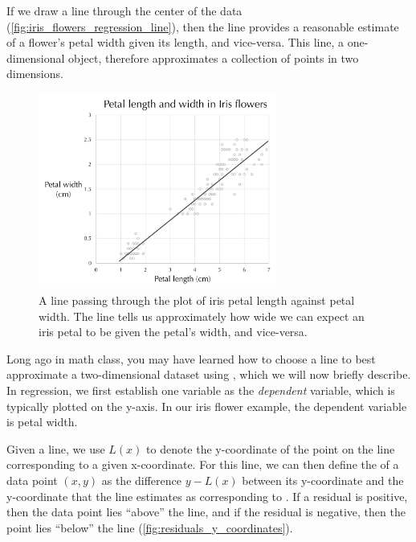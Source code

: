 If we draw a line through the center of the data (\autoref{fig:iris_flowers_regression_line}), then the line provides a reasonable estimate of a flower's petal width given its length, and vice-versa. This line, a one-dimensional object, therefore approximates a collection of points in two dimensions.\\

\begin{figure}[h]
\centering
\mySfFamily
\includegraphics[width = 0.7\textwidth]{../images/iris_flowers_regression_line.png}
\caption{A line passing through the plot of iris petal length against petal width. The line tells us approximately how wide we can expect an iris petal to be given the petal's width, and vice-versa.}
\label{fig:iris_flowers_regression_line}
\end{figure}

\begin{qbox}\end{qbox}

Long ago in math class, you may have learned how to choose a line to best approximate a two-dimensional dataset using , which we will now briefly describe. In regression, we first establish one variable as the \textit{dependent} variable, which is typically plotted on the y-axis. In our iris flower example, the dependent variable is petal width.

Given a line, we use $L(x)$ to denote the y-coordinate of the point on the line corresponding to a given x-coordinate. For this line, we can then define the  of a data point $(x, y)$ as the difference $y - L(x)$ between its y-coordinate and the y-coordinate that the line estimates as corresponding to . If a residual is positive, then the data point lies ``above'' the line, and if the residual is negative, then the point lies ``below'' the line (\autoref{fig:residuals_y_coordinates}).\\


